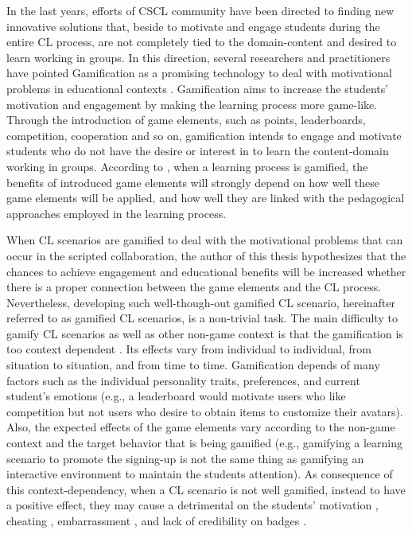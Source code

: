 In the last years, efforts of CSCL community have been directed to finding new innovative solutions that, beside to motivate and engage students during the entire CL process, are not completely tied to the domain-content and desired to learn working in groups.
In this direction, several researchers and practitioners have pointed Gamification as a promising technology to deal with motivational problems in educational contexts \cite{ChallcoMoreiraMizoguchiIsotani2014, SeabornFels2015, BorgesDurelliReisIsotani2014}.
Gamification  \cite{DeterdingDixonKhaledNacke2011} aims to increase the students' motivation and engagement by making the learning process more game-like.
Through the introduction of game elements, such as points, leaderboards, competition, cooperation and so on, gamification intends to engage and motivate students who do not have the desire or interest in to learn the content-domain working in groups.
According to \cite{Kapp2012, KnutasIkonenNikulaPorras2014}, when a learning process is gamified, the benefits of introduced game elements will strongly depend on how well these game elements will be applied, and how well they are linked with the pedagogical approaches employed in the learning process.

When CL scenarios are gamified to deal with the motivational problems that can occur in the scripted collaboration, the author of this thesis hypothesizes that the chances to achieve engagement and educational benefits will be increased whether there is a proper connection between the game elements and the CL process.
Nevertheless, developing such well-though-out gamified CL scenario, hereinafter referred to as gamified CL scenarios, is a non-trivial task.
The main difficulty to gamify CL scenarios as well as other non-game context is that the gamification is too context dependent \cite{HamariKoivistoSarsa2014, RichardsThompsonGraham2014}.
Its effects vary from individual to individual, from situation to situation, and from time to time.
Gamification depends of many factors such as the individual personality traits, preferences, and current student's emotions \cite{Nicholson2015, PedroLopesPratesVassilevaIsotani2015}
(e.g., a leaderboard would motivate users who like competition but not users who desire to obtain items to customize their avatars).
Also, the expected effects of the game elements vary according to the non-game context and the target behavior that is being gamified \cite{DeterdingBjorkNackeDixonLawley2013, HeeterLeeMedlerMagerko2011}
(e.g., gamifying a learning scenario to promote the signing-up is not the same thing as gamifying an interactive environment to maintain the students attention).
As consequence of this context-dependency, when a CL scenario is not well gamified, instead to have a positive effect, they may cause a detrimental on the students' motivation \cite{AndradeMizoguchiIsotani2016}, cheating \cite{NunesBittencourtIsotaniJaques2016}, embarrassment \cite{OhnoYamasakiTokiwa2013}, and lack of credibility on badges \cite{DavisSingh2015}.

